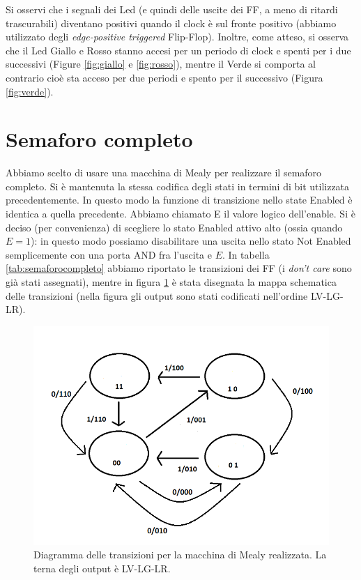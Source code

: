 \documentclass[10pt,a4paper]{article}
\begin{document}
Si osservi che i segnali dei Led (e quindi delle uscite dei FF, a meno di ritardi trascurabili) diventano positivi quando il clock è sul fronte positivo (abbiamo utilizzato degli \emph{edge-positive triggered} Flip-Flop). Inoltre, come atteso, si osserva che il Led Giallo e Rosso stanno accesi per un periodo di clock e spenti per i due successivi (Figure \ref{fig:giallo} e \ref{fig:rosso}), mentre il Verde si comporta al contrario cioè sta acceso per due periodi e spento per il successivo (Figura \ref{fig:verde}).

\section{Semaforo completo}
Abbiamo scelto di usare una macchina di Mealy per realizzare il semaforo completo. Si è mantenuta la stessa codifica degli stati in termini di bit utilizzata precedentemente. In questo modo la funzione di transizione nello state Enabled è identica a quella precedente. Abbiamo chiamato E il valore logico dell'enable.
Si è deciso (per convenienza) di scegliere lo stato Enabled attivo alto (ossia quando $E = 1$): in questo modo possiamo disabilitare una uscita nello stato Not Enabled semplicemente con una porta AND fra l'uscita e $E$. In tabella \ref{tab:semaforocompleto} abbiamo riportato le transizioni dei FF (i \emph{don't care} sono già stati assegnati), mentre in figura \ref{fig:FSMcomplete} è stata disegnata la mappa schematica delle transizioni (nella figura gli output sono stati codificati nell'ordine LV-LG-LR).

\begin{figure}[!htb]
\centering
\includegraphics[scale=0.7]{FSMcomplete.png}
\caption{Diagramma delle transizioni per la macchina di Mealy realizzata. La terna degli output è LV-LG-LR.\label{fig:FSMcomplete}}
\end{figure}
\end{document}
